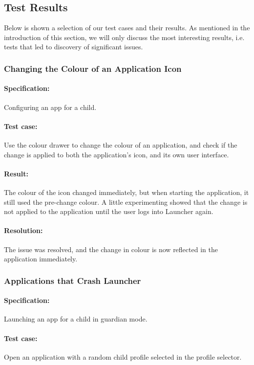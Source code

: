 \subsection{Test Results}\label{sec:sprint1:testing_results}
Below is shown a selection of our test cases and their results.
As mentioned in the introduction of this section, we will only discuss the most interesting results, i.e. tests that led to discovery of significant issues.


\subsubsection{Changing the Colour of an Application Icon}

\paragraph{Specification:} Configuring an app for a child.
\paragraph{Test case:} Use the colour drawer to change the colour of an application, and check if the change is applied to both the application's icon, and its own user interface.
\paragraph{Result:} The colour of the icon changed immediately, but when starting the application, it still used the pre-change colour. A little experimenting showed that the change is not applied to the application until the user logs into Launcher again.
\paragraph{Resolution:} The issue was resolved, and the change in colour is now reflected in the application immediately.


\subsubsection{Applications that Crash Launcher}

\paragraph{Specification:} Launching an app for a child in guardian mode.
\paragraph{Test case:} Open an application with a random child profile selected in the profile selector.
